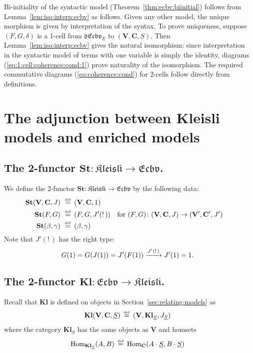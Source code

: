 \documentclass{LMCS}
\newcommand{\bang}[1]{{!} \,#1}
\newcommand{\co}{\colon}
\newcommand{\VCat}{\fixedcatfont{V}} \newcommand{\CCat}{\fixedcatfont{C}} \newcommand{\DCat}{\fixedcatfont{D}}
\newcommand{\ltensor}[2]{#1 \cdot #2}
\newcommand{\fixedcatfont}{\mathbf}
\newcommand{\SA}{A}
\newcommand{\SB}{B}
\newcommand{\stateobj}{{\underline{S}}}
\newcommand{\CATECBV}{\TwoCatFont{Ecbv}}
\newcommand{\dCATECBV}{\TwoCatFont{dEcbv}}
\newcommand{\Freyd}{\TwoCatFont{Kleisli}}
\newcommand{\CATECBVtheory}[1]{\dCATECBV_{#1}}
\newcommand{\FreydToECBV}{\mathbf{St}}
\newcommand{\ECBVToFreyd}{\mathbf{Kl}}
\newcommand{\KlCat}[3]{\mathbf{Kl}_{#3}} \newcommand{\Klltensor}[2]{#1 \cdot_{\mathbf{Kl}} #2}
\newcommand{\stateiso}{\delta}
\newcommand{\VTwoCell}{\beta}
\newcommand{\CTwoCell}{\gamma}
\newcommand{\TwoCatFont}[1]{\mathfrak{#1}}
\newcommand{\defeq}{\mathrel{\,\stackrel{\mbox{\tiny{$\mathrm{def}$}}}=\,}}
\begin{document}
Bi-initiality of the syntactic model
(Theorem~\ref{thm:ecbv:biinitial}) follows from Lemma~\ref{lem:iso:interp:ecbv} as follows.
Given any other model, the unique morphism is given by interpretation of the syntax. To prove uniqueness, suppose $(F,G, \stateiso)$ is a 1-cell from $\CATECBVtheory{E}$ to  $(\VCat, \CCat, \stateobj)$. Then Lemma~\ref{lem:iso:interp:ecbv} gives the natural isomorphism: since interpretation in the syntactic model of terms with one variable is simply the identity, diagrams  (\ref{eq:1:cell:coherence:cond:1}) prove naturality of the isomorphism. The required commutative diagrams (\ref{eq:coherence:cond}) for 2-cells follow directly from definitions. 



\section{The adjunction between Kleisli models and enriched models}
\label{app:adjunction}

\subsection{The 2-functor $\FreydToECBV \colon \Freyd \to \CATECBV$.} 
We define the 2-functor $\FreydToECBV \colon \Freyd \to \CATECBV$ by the following data:
\begin{align*}
\FreydToECBV(\VCat, \CCat, J) & \,\defeq (\VCat, \CCat, 1) \\
\FreydToECBV(F,G) & \,\defeq (F,G, J'(\bang{})) && \text{for } (F,G) \co (\VCat, \CCat, J) \to (\VCat', \CCat', J') \\
\FreydToECBV(\VTwoCell, \CTwoCell) & \,\defeq (\VTwoCell, \CTwoCell) 
\end{align*}
Note that $J'(\bang{})$ has the right type:
\[
G(1) = G(J(1))  =  J'(F(1)) \xrightarrow{J'(\bang{})} J'(1) = 1
\text.\]

\subsection{The 2-functor $\ECBVToFreyd \colon \CATECBV \to \Freyd$.} 
\label{app:ECBVToFreyd}

Recall that $\ECBVToFreyd$ is defined on objects in Section~\ref{sec:relating:models} as
\begin{align*}
\ECBVToFreyd(\VCat, \CCat, \stateobj) \defeq (\VCat, \KlCat{\VCat}{\CCat}{\stateobj}, J_{\stateobj})
\end{align*}
where the category $\KlCat{\VCat}{\CCat}{\stateobj}$ has the same objects as $\VCat$ and homsets
\[
\Homset{\KlCat{\VCat}{\CCat}{\stateobj}}{\SA}{\SB} \defeq \Homset{\CCat}{\ltensor{\SA}{\stateobj}}{\ltensor{\SB}{\stateobj}}
\]
\end{document}
